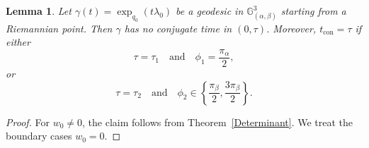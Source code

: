 \documentclass[12pt]{amsart}
\numberwithin{equation}{section}
\theoremstyle{plain}
\newtheorem{lemma}[theorem]{Lemma}%
\theoremstyle{definition}
\theoremstyle{remark}
\begin{document}
\begin{lemma}\label{Con Times 3D}
    Let \(\gamma(t)=\exp_{q_0}(t\lambda_0)\) be a geodesic in
    \(\mathbb G^3_{(\alpha,\beta)}\) starting from a Riemannian point. Then \(\gamma\) has no
    conjugate time in \((0,\tau)\). Moreover, \(t_{\operatorname{con}}=\tau\) if either
    \[
        \tau=\tau_1
        \quad\text{and}\quad
        \phi_1=\frac{\pi_\alpha}{2},
    \]
    or
    \[
        \tau=\tau_2
        \quad\text{and}\quad
        \phi_2\in
        \left\{
        \frac{\pi_\beta}{2},
        \frac{3\pi_\beta}{2}
        \right\}.
    \]
\end{lemma}

\begin{proof}
    For \(w_0\neq0\), the claim follows from Theorem~\ref{Determinant}. We treat the boundary
    cases \(w_0=0\).


\end{proof}
\end{document}
